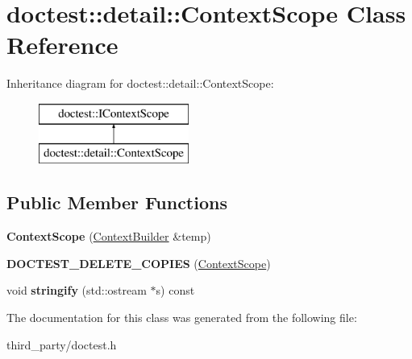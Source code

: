 \hypertarget{classdoctest_1_1detail_1_1_context_scope}{}\section{doctest\+::detail\+::Context\+Scope Class Reference}
\label{classdoctest_1_1detail_1_1_context_scope}
Inheritance diagram for doctest\+::detail\+::Context\+Scope\+:\begin{figure}[H]
\begin{center}
\leavevmode
\includegraphics[height=2.000000cm]{classdoctest_1_1detail_1_1_context_scope}
\end{center}
\end{figure}
\subsection*{Public Member Functions}
\begin{DoxyCompactItemize}
\item 
\mbox{\label{classdoctest_1_1detail_1_1_context_scope_a6a6632c2f0cabd781de5a07291ed8a75}} 
{\bfseries Context\+Scope} (\mbox{\hyperlink{classdoctest_1_1detail_1_1_context_builder}{Context\+Builder}} \&temp)
\item 
\mbox{\label{classdoctest_1_1detail_1_1_context_scope_a27ac79cbdd984dce6bd62f001770d539}} 
{\bfseries D\+O\+C\+T\+E\+S\+T\+\_\+\+D\+E\+L\+E\+T\+E\+\_\+\+C\+O\+P\+I\+ES} (\mbox{\hyperlink{classdoctest_1_1detail_1_1_context_scope}{Context\+Scope}})
\item 
\mbox{\label{classdoctest_1_1detail_1_1_context_scope_aefebc1b019b0d1c5a7f359d2d1bc7e25}} 
void {\bfseries stringify} (std\+::ostream $\ast$s) const
\end{DoxyCompactItemize}


The documentation for this class was generated from the following file\+:\begin{DoxyCompactItemize}
\item 
third\+\_\+party/doctest.\+h\end{DoxyCompactItemize}

